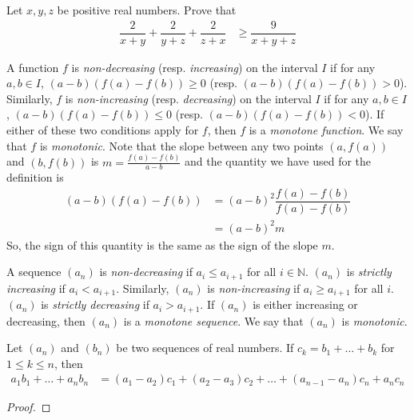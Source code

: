 \documentclass{subfile}
\begin{document}
		\begin{problem}
			Let $x,y,z$ be positive real numbers. Prove that
				\begin{align*}
					\dfrac{2}{x+y}+\dfrac{2}{y+z}+\dfrac{2}{z+x}
						& \geq \dfrac{9}{x+y+z}
				\end{align*}

				\begin{solution}

				\end{solution}
		\end{problem}
	A function $f$ is \textit{non-decreasing} (resp. \textit{increasing}) on the interval $I$ if for any $a,b\in I$, $(a-b)(f(a)-f(b))\geq0$ (resp. $(a-b)(f(a)-f(b))>0$). Similarly, $f$ is \textit{non-increasing} (resp. \textit{decreasing}) on the interval $I$ if for any $a,b\in I$, $(a-b)(f(a)-f(b))\leq0$ (resp. $(a-b)(f(a)-f(b))<0$). If either of these two conditions apply for $f$, then $f$ is a \textit{monotone function}. We say that $f$ is \textit{monotonic}.
	Note that the slope between any two points $(a,f(a))$ and $(b,f(b))$ is $m=\frac{f(a)-f(b)}{a-b}$ and the quantity we have used for the definition is
		\begin{align*}
			(a-b)(f(a)-f(b))
				& = (a-b)^2\dfrac{f(a)-f(b)}{f(a)-f(b)}\\
				& = (a-b)^2m
		\end{align*}
	So, the sign of this quantity is the same as the sign of the slope $m$.

	A sequence $(a_n)$ is \textit{non-decreasing} if $a_i\leq a_{i+1}$ for all $i\in\mathbb{N}$. $(a_n)$ is \textit{strictly increasing} if $a_i<a_{i+1}$. Similarly, $(a_n)$ is \textit{non-increasing} if $a_i\geq a_{i+1}$ for all $i$. $(a_n)$ is \textit{strictly decreasing} if $a_i>a_{i+1}$. If $(a_n)$ is either increasing or decreasing, then $(a_n)$ is a \textit{monotone sequence}. We say that $(a_n)$ is \textit{monotonic}.
		\begin{theorem}\label{thm:abelform}
			Let $(a_{n})$ and $(b_{n})$ be two sequences of real numbers. If $c_{k}=b_{1}+\ldots+b_{k}$ for $1\leq k\leq n$, then
				\begin{align*}
					a_{1}b_{1}+\ldots+a_{n}b_{n}
						& = (a_{1}-a_{2})c_{1}+(a_{2}-a_{3})c_{2}+\ldots+(a_{n-1}-a_{n})c_{n}+a_{n}c_{n}
				\end{align*}

				\begin{proof}

				\end{proof}
		\end{theorem}
\end{document}
